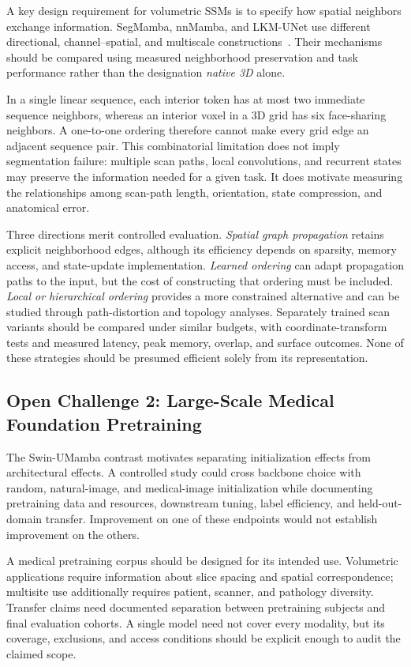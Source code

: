 \documentclass[5p,times,authoryear]{elsarticle}
\begin{document}
A key design requirement for volumetric SSMs is to specify how spatial neighbors exchange information. SegMamba, nnMamba, and LKM-UNet use different directional, channel--spatial, and multiscale constructions~\citep{xing2024segmamba,gong2025nnmamba,wang2024lkm}. Their mechanisms should be compared using measured neighborhood preservation and task performance rather than the designation \emph{native 3D} alone.

In a single linear sequence, each interior token has at most two immediate sequence neighbors, whereas an interior voxel in a 3D grid has six face-sharing neighbors. A one-to-one ordering therefore cannot make every grid edge an adjacent sequence pair. This combinatorial limitation does not imply segmentation failure: multiple scan paths, local convolutions, and recurrent states may preserve the information needed for a given task. It does motivate measuring the relationships among scan-path length, orientation, state compression, and anatomical error.

Three directions merit controlled evaluation. \emph{Spatial graph propagation} retains explicit neighborhood edges, although its efficiency depends on sparsity, memory access, and state-update implementation. \emph{Learned ordering} can adapt propagation paths to the input, but the cost of constructing that ordering must be included. \emph{Local or hierarchical ordering} provides a more constrained alternative and can be studied through path-distortion and topology analyses. Separately trained scan variants should be compared under similar budgets, with coordinate-transform tests and measured latency, peak memory, overlap, and surface outcomes. None of these strategies should be presumed efficient solely from its representation.

\subsection{Open Challenge 2: Large-Scale Medical Foundation Pretraining}
\label{subsec:pretraining}

The Swin-UMamba contrast motivates separating initialization effects from architectural effects. A controlled study could cross backbone choice with random, natural-image, and medical-image initialization while documenting pretraining data and resources, downstream tuning, label efficiency, and held-out-domain transfer. Improvement on one of these endpoints would not establish improvement on the others.

A medical pretraining corpus should be designed for its intended use. Volumetric applications require information about slice spacing and spatial correspondence; multisite use additionally requires patient, scanner, and pathology diversity. Transfer claims need documented separation between pretraining subjects and final evaluation cohorts. A single model need not cover every modality, but its coverage, exclusions, and access conditions should be explicit enough to audit the claimed scope.
\end{document}
